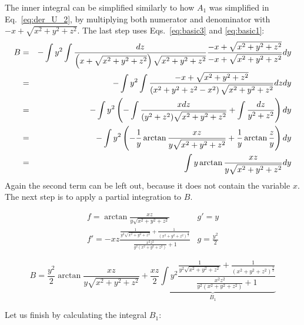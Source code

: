 The inner integral can be simplified similarly to how $A_1$ was simplified in Eq.~\eqref{eq:der_U_2}, 
by multiplying both numerator and denominator with $-x+\sqrt{x^2+y^2+z^2}$. The last step uses Eqs.~\eqref{eq:basic3} and \eqref{eq:basic1}:
\begin{eqnarray}
B 
&=& 
-\int y^2 \int \frac{dz}{\left( x + \sqrt{x^2+y^2+z^2} \right) \sqrt{x^2+y^2+z^2}} 
\frac{-x + \sqrt{x^2+y^2+z^2}}{-x + \sqrt{x^2+y^2+z^2}} dy \nonumber\\
&=& - \int y^2 \int \frac{-x + \sqrt{x^2+y^2+z^2} }{\left( x^2 + y^2+z^2 -x^2 \right) \sqrt{x^2+y^2+z^2}}dz dy \nonumber\\
&=& - \int y^2 \left( 
- \int \frac{x dz}{(y^2+z^2)\sqrt{x^2+y^2+z^2}} +
\int \frac{dz}{y^2+z^2} 
\right) dy \nonumber\\
&=& - \int y^2 \left( -\frac{1}{y} \arctan{\frac{xz}{y\sqrt{x^2+y^2+z^2}}} + \frac{1}{y} \arctan{\frac{z}{y}}\right) dy \nonumber\\
&=& \int y \arctan{\frac{xz}{y\sqrt{x^2+y^2+z^2}}} dy
\end{eqnarray}
Again the second term can be left out, because it does not contain the variable $x$. The next step is to apply a partial integration to $B$.  

\[
\begin{array}{c|c}
  f=\arctan{\frac{xz}{y\sqrt{x^2+y^2+z^2}}} & g'=y \\ 
  \hline
  f' = -xz \frac{\frac{1}{y^2 \sqrt{x^2+y^2+z^2}}+\frac{1}{(x^2+y^2+z^2)^\frac{3}{2}}}{\frac{x^2z^2}{y^2(x^2+y^2+z^2)}+1} & g = \frac{y^2}{2}
 \end{array}
\]

\begin{equation}
B = 
\frac{y^2}{2} \arctan{\frac{xz}{y\sqrt{x^2+y^2+z^2}}} +
\underbrace{
\frac{xz}{2} \int y^2 \frac{\frac{1}{y^2\sqrt{x^2+y^2+z^2}}+\frac{1}{(x^2+y^2+z^2)^\frac{3}{2}}}{\frac{x^2z^2}{y^2(x^2+y^2+z^2)}+1}}_{B_1}
\end{equation}

Let us finish by calculating the integral $B_1$:

